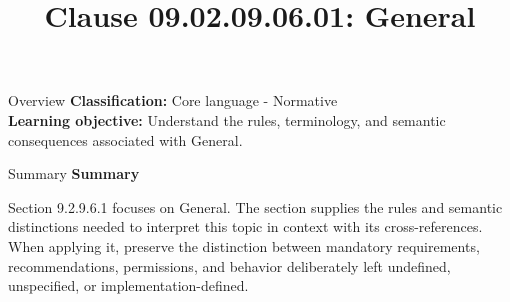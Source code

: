 \documentclass[10pt,letterpaper]{article}
\title{Clause 09.02.09.06.01: General}
\author{}
\date{}
\begin{document}
\maketitle
\begin{CornellOverviewBox}{Overview}
\textbf{Classification:} Core language - Normative\\[2pt]
\textbf{Learning objective:} Understand the rules, terminology, and semantic consequences associated with General.
\end{CornellOverviewBox}\begin{CornellSummaryBox}{Summary}
{\sffamily\bfseries\color{Accent} Summary}\par\vspace{3pt}Section 9.2.9.6.1 focuses on General. The section supplies the rules and semantic distinctions needed to interpret this topic in context with its cross-references. When applying it, preserve the distinction between mandatory requirements, recommendations, permissions, and behavior deliberately left undefined, unspecified, or implementation-defined.
\end{CornellSummaryBox}
\end{document}
